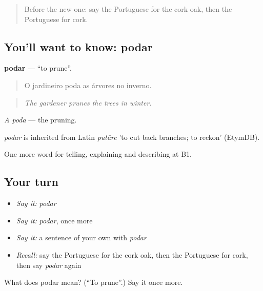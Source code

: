 \begin{quote}
Before the new one: say the Portuguese for the cork oak, then the Portuguese for cork.
\end{quote}

\subsection*{You'll want to know: podar}
\textbf{podar} — \textquotedblleft{}to prune\textquotedblright{}.

\begin{quote}
O jardineiro poda as árvores no inverno.
\end{quote}

\begin{quote}
\emph{The gardener prunes the trees in winter.}
\end{quote}

\emph{A poda} — the pruning.

\begin{cousinweb}
\emph{podar} is inherited from Latin \emph{putāre} 'to cut back branches; to reckon' (EtymDB).
\end{cousinweb}

\begin{grammarlens}[title={What you've built}]
One more word for telling, explaining and describing at B1.
\end{grammarlens}

\subsection*{Your turn}
\begin{itemize}
\raggedright
  \item \emph{Say it:} \emph{podar}
  \item \emph{Say it:} \emph{podar}, once more
  \item \emph{Say it:} a sentence of your own with \emph{podar}
  \item \emph{Recall:} say the Portuguese for the cork oak, then the Portuguese for cork, then say \emph{podar} again
\end{itemize}

\begin{tcolorbox}[breakable,colback=teal!4,colframe=teal!35!black,title={Before you move on}]
What does podar mean? (\textquotedblleft{}To prune\textquotedblright{}.) Say it once more.
\end{tcolorbox}
